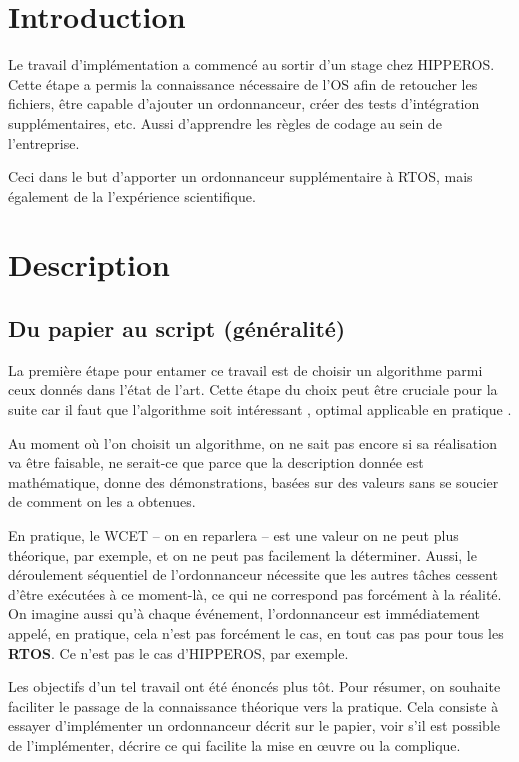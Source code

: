 \section{Introduction}

Le travail d'implémentation a commencé au sortir d'un stage chez HIPPEROS. 
Cette étape a permis la connaissance nécessaire de l'OS afin de retoucher les fichiers, 
être capable d'ajouter un ordonnanceur, créer des tests d'intégration supplémentaires, etc.
Aussi d'apprendre les règles de codage au sein de l'entreprise. 

Ceci dans le but d'apporter un ordonnanceur supplémentaire à RTOS, mais également de la 
l'expérience scientifique.




\section{Description}
	\subsection{Du papier au script (généralité)}
	La première étape pour entamer ce travail est de choisir un algorithme parmi ceux donnés dans l'état de l'art.
	Cette étape du choix peut être cruciale pour la suite car il faut que l'algorithme soit 
	intéressant ,
	optimal 
	applicable en pratique .
	
	Au moment où l'on choisit un algorithme, on ne sait pas encore si sa réalisation va être faisable, 
	ne serait-ce que parce que la description donnée est mathématique, donne des démonstrations, 
	basées sur des valeurs sans se soucier de comment on les a obtenues.
	
	En pratique, le WCET -- on en reparlera -- est une valeur on ne peut plus théorique, par exemple, 
	et on ne peut pas facilement la déterminer. 
	Aussi, le déroulement séquentiel de l'ordonnanceur nécessite que les autres tâches cessent d'être exécutées 
	à ce moment-là, ce qui ne correspond pas forcément à la réalité.
	On imagine aussi qu'à chaque événement, l'ordonnanceur est immédiatement appelé, 
	en pratique, cela n'est pas forcément le cas, en tout cas pas pour tous les 
	\textbf{RTOS}. Ce n'est pas le cas d'HIPPEROS, par exemple.

	Les objectifs d'un tel travail ont été énoncés plus tôt. 
	Pour résumer, on souhaite faciliter le passage de la connaissance théorique vers la pratique.
	Cela consiste à essayer d'implémenter un ordonnanceur décrit sur le papier, voir s'il est 
	possible de l'implémenter, décrire ce qui facilite la mise en œuvre ou la complique. 
	
